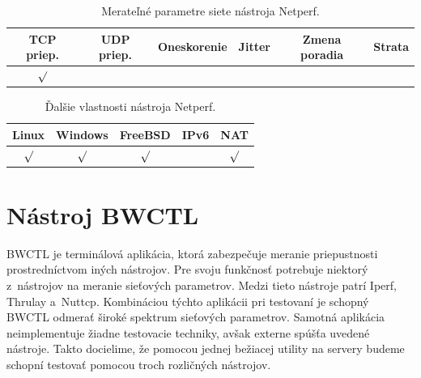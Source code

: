         \begin{table}[H]
            \begin{center}
                \begin{tabular}{|c|c|c|c|c|c|}
                    \hline
                    \textbf{TCP priep.}  &  \textbf{UDP priep.}  &
                    \textbf{Oneskorenie} & \textbf{Jitter} &
                    \textbf{Zmena poradia} & \textbf{Strata} \\
                    \hline
                    $\surd$ & &  &  &  & \\ 
                    \hline
                \end{tabular}
                \caption{Merateľné parametre siete nástroja Netperf.}
                \label{tab_netperf_param}
            \end{center}
        \end{table}

        \begin{table}[H]
            \begin{center}
                \begin{tabular}{|c|c|c|c|c|}
                    \hline
                    \textbf{Linux}  &  \textbf{Windows}  &
                    \textbf{FreeBSD} & \textbf{IPv6} &
                    \textbf{NAT} \\
                    \hline
                    $\surd$ & $\surd$ & $\surd$ &  & $\surd$ \\ 
                    \hline
                \end{tabular}
                \caption{Ďalšie vlastnosti nástroja Netperf.}
                \label{tab_netperf_vlast}
            \end{center}
        \end{table}

    \section{Nástroj BWCTL} \label{bwctl}
    BWCTL je terminálová aplikácia, ktorá zabezpečuje meranie priepustnosti
    prostredníctvom iných nástrojov. 
    Pre svoju funkčnosť potrebuje niektorý z~nástrojov na
    meranie sieťových parametrov. Medzi tieto nástroje patrí Iperf, Thrulay
    a~Nuttcp. Kombináciou týchto aplikácii pri testovaní je schopný BWCTL
    odmerať široké spektrum sieťových parametrov. Samotná aplikácia
    neimplementuje žiadne testovacie techniky, avšak externe spúšťa uvedené
    nástroje. Takto docielime, že pomocou jednej bežiacej utility na
    servery budeme schopní testovať pomocou troch rozličných nástrojov.

